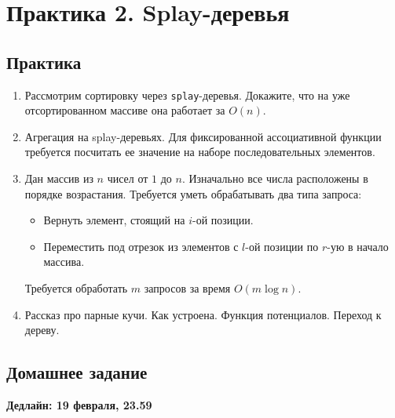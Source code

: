 \section{Практика 2. Splay-деревья}

\subsection{Практика}

\begin{enumerate}

  \item Рассмотрим сортировку через \texttt{splay}-деревья. Докажите, что на 
уже отсортированном массиве она работает за $O(n)$.
  
  \item Агрегация на splay-деревьях. Для фиксированной ассоциативной функции
требуется посчитать ее значение на наборе последовательных элементов.

  \item Дан массив из $n$ чисел от $1$ до $n$. Изначально все числа расположены
в порядке возрастания. Требуется уметь обрабатывать два типа запроса:
  \begin{itemize}
    \item Вернуть элемент, стоящий на $i$-ой позиции.
    \item Переместить под отрезок из элементов с $l$-ой позиции по $r$-ую в 
       начало массива.
  \end{itemize}
  Требуется обработать $m$ запросов за время $O(m \log n)$.

  \item Рассказ про парные кучи. Как устроена. Функция потенциалов. Переход
к дереву.

\end{enumerate}

\subsection{Домашнее задание}
\textbf{Дедлайн: 19 февраля, 23.59}


